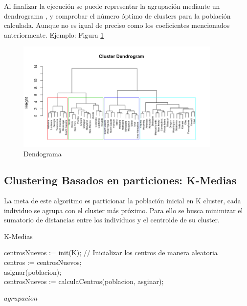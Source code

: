 		\newpage


		Al finalizar la ejecución se puede representar la agrupación mediante un dendrograma \cite{espinoza2012using}, y comprobar el número óptimo de clusters para la población calculada. Aunque no es igual de preciso como los coeficientes mencionados anteriormente. Ejemplo: Figura \ref{fig:dendograma}
		
		\begin{figure}[!h]
			\centering
			\includegraphics[width=0.9\textwidth]{images/chapter_2/dendograma}
			\caption{Dendograma}
			\label{fig:dendograma}
		\end{figure}


	\subsection{Clustering Basados en particiones: K-Medias}

		La meta de este algoritmo es particionar la población inicial en K cluster, cada individuo se agrupa con el cluster más próximo. Para ello se busca minimizar el sumatorio de distancias entre los individuos y el centroide de su cluster. 
		
		
		\begin{algorithm}[!h]
			\caption{K-Medias}
			centrosNuevos := init(K); // Inicializar los centros de manera aleatoria\\
			centros := centrosNuevos;\\
			{
				asignar(poblacion);\\
				centrosNuevos := calculaCentros(poblacion, asginar);		
			}
			
			
			\Return $agrupacion$\;
		\end{algorithm}
		
